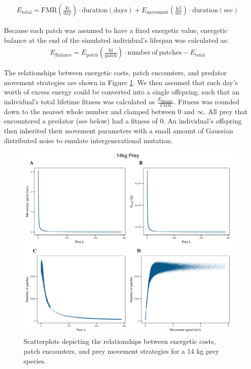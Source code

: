 \documentclass[12pt]{article}
\begin{document}
\begin{gather}
E_{\mathrm{total}} = \mathrm{FMR (\frac{kj}{day}) \cdot duration (days)} + E_{\mathrm{movement}} \mathrm{(\frac{kJ}{sec}) \cdot duration (sec)}
\end{gather}

Because each patch was assumed to have a fixed energetic value, energetic balance at the end of the simulated individual's lifespan was calculated as:
\begin{gather}
E_{\mathrm{Balance}} = E_{\mathrm{patch}} \mathrm{(\frac{kj}{patch})} \cdot \mathrm{number~of~patches} - E_{\mathrm{total}}
\end{gather}

The relationships between energetic costs, patch encounters, and predator movement strategies are shown in Figure \ref{fig:Prey_Diagnostics}.  We then assumed that each day’s worth of excess energy could be converted into a single offspring, such that an individual's total lifetime fitness was calculated as $\frac{E_{\mathrm{Balance}}}{FMR}$. Fitness was rounded down to the nearest whole number and clamped between 0 and $\infty$. All prey that encountered a predator (see below) had a fitness of 0. An individual's offspring then inherited their movement parameters with a small amount of Gaussian distributed noise to emulate intergenerational mutation.

\begin{figure}[!h]
\centering
\includegraphics[scale=0.08]{Prey_Diagnostics.png}
\caption{Scatterplots depicting the relationships between energetic costs, patch encounters, and prey movement strategies for a 14 kg prey species.}
\label{fig:Prey_Diagnostics}
\end{figure}
\end{document}
